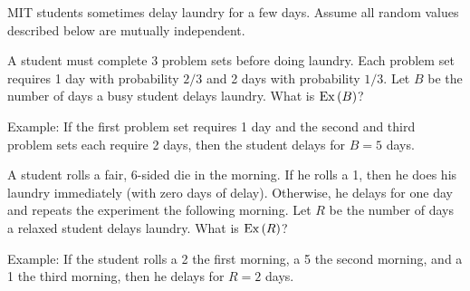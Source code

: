 \documentclass[12pt,oneside]{article}
\begin{document}
\begin{problem}[12 points]
MIT students sometimes delay laundry for a few days.  Assume all
random values described below are mutually independent.

\bparts

\ppart A  student must complete 3 problem sets before doing
laundry.  Each problem set requires 1 day with probability $2/3$ and 2
days with probability $1/3$.  Let $B$ be the number of days a busy
student delays laundry.  What is $\operatorname{Ex}\left(B\right)$?

Example: If the first problem set requires 1 day and the second and
third problem sets each require 2 days, then the student delays for $B
= 5$ days.


\ppart A  student rolls a fair, 6-sided die in the
morning.  If he rolls a 1, then he does his laundry immediately (with
zero days of delay).  Otherwise, he delays for one day and repeats the
experiment the following morning.  Let $R$ be the number of days a
relaxed student delays laundry.  What is $\operatorname{Ex}\left(R\right)$?

Example: If the student rolls a 2 the first morning, a 5 the second
morning, and a 1 the third morning, then he delays for $R = 2$ days.



\end{problem}
\end{document}

